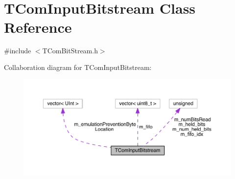 \hypertarget{class_t_com_input_bitstream}{}\section{T\+Com\+Input\+Bitstream Class Reference}
\label{class_t_com_input_bitstream}


{\ttfamily \#include $<$T\+Com\+Bit\+Stream.\+h$>$}



Collaboration diagram for T\+Com\+Input\+Bitstream\+:
\nopagebreak
\begin{figure}[H]
\begin{center}
\leavevmode
\includegraphics[width=350pt]{d5/dbe/class_t_com_input_bitstream__coll__graph}
\end{center}
\end{figure}
